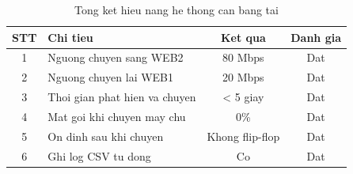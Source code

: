 \begin{table}[H]
\centering
\caption{Tong ket hieu nang he thong can bang tai}
\vspace{0.3cm}
\begin{tabularx}{\textwidth}{|c|>{\raggedright\arraybackslash}X|c|c|}
    \hline
    \textbf{STT} & \textbf{Chi tieu} & \textbf{Ket qua} & \textbf{Danh gia} \\ \hline
    1 & Nguong chuyen sang WEB2 & 80 Mbps & Dat \\ \hline
    2 & Nguong chuyen lai WEB1 & 20 Mbps & Dat \\ \hline
    3 & Thoi gian phat hien va chuyen & < 5 giay & Dat \\ \hline
    4 & Mat goi khi chuyen may chu & 0\% & Dat \\ \hline
    5 & On dinh sau khi chuyen & Khong flip-flop & Dat \\ \hline
    6 & Ghi log CSV tu dong & Co & Dat \\ \hline
\end{tabularx}
\label{tab:lb_perf}
\end{table}
